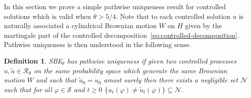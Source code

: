\documentclass[11pt,a4paper,reqno]{amsart}
\newtheorem{definition}{Definition}
\begin{document}
In this section we prove a simple pathwise uniqueness result for controlled solutions which is valid when $\theta > 5/4$. Note that to each controlled solution $u$  is naturally associated a cylindrical Brownian motion $W$ on $H$ given by the martingale part of the controlled decomposition~\eqref{eq:controlled-decomposition}. Pathwise uniqueness is then understood in the following sense.

\begin{definition}
SBE$_\theta$ has pathwise uniqueness if given two controlled processes $u,\tilde u\in\mathcal{R}_\theta$ on the same probability space which generate the same Brownian motion $W$ and such that $\tilde u_0 = u_0$ amost surely then there exists a negligible set $\mathcal{N}$ such that for all $\varphi\in\mathcal{S}$ and $t\ge 0$  $\{u_t(\varphi) \neq \tilde u_t(\varphi)\} \subseteq \mathcal{N}$.
\end{definition}  
\end{document}

